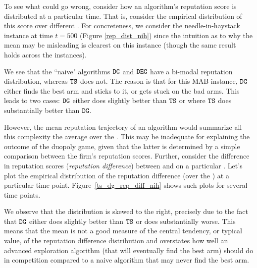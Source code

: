 \documentclass[../competing_bandits.tex]{subfiles}
\begin{document}
To see what could go wrong, consider how an algorithm's reputation score is distributed at a particular time. That is, consider the empirical distribution of this score over different \MRVs. For concreteness, we consider the needle-in-haystack instance at time $t=500$ (Figure \ref{rep_dist_nih}) since the intuition as to why the mean may be misleading is clearest on this instance (though the same result holds across the instances).

We see that the ``naive" algorithms $\mathtt{DG}$ and $\mathtt{DEG}$ have a bi-modal reputation distribution, whereas $\mathtt{TS}$ does not. The reason is that for this MAB instance, $\mathtt{DG}$ either finds the best arm and sticks to it, or gets stuck on the bad arms. This leads to two cases: $\mathtt{DG}$ either does slightly better than $\mathtt{TS}$ or where $\mathtt{TS}$ does substantially better than $\mathtt{DG}$.

However, the mean reputation trajectory of an algorithm would summarize all this complexity the average over the \MRVs. This may be inadequate for explaining the outcome of the duopoly game, given that the latter is determined by a simple comparison between the firm's reputation scores. Further, consider the difference in reputation scores (\emph{reputation difference}) between \TS and \DG on a particular \MRV. Let's plot the empirical distribution of the reputation difference (over the \MRVs) at a particular time point. Figure~\ref{ts_dg_rep_diff_nih} shows such plots for several time points.

We observe that the distribution is skewed to the right, precisely due to the fact that $\mathtt{DG}$ either does slightly better than $\mathtt{TS}$ or does substantially worse. This means that the mean is not a good measure of the central tendency, or typical value, of the reputation difference distribution and overstates how well an advanced exploration algorithm (that will eventually find the best arm) should do in competition compared to a naive algorithm that may never find the best arm.
\end{document}
